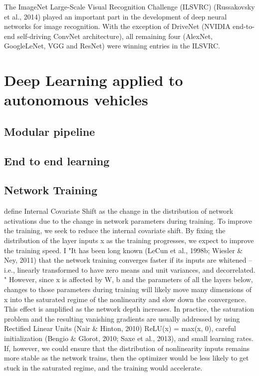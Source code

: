 The  ImageNet Large-Scale Visual Recognition Challenge (ILSVRC) (Russakovsky et al., 2014) played an important part in the development of deep neural networks for image recognition. With the exception of DriveNet (NVIDIA end-to-end self-driving ConvNet architecture), all remaining four (AlexNet, GoogleLeNet, VGG and ResNet) were winning entries in the ILSVRC.  




\section{Deep Learning applied to autonomous vehicles}

\subsection{Modular pipeline}

\subsection{End to end learning}

\subsection{Network Training}

\cite{ioffe2015batch, 7005077}
define Internal Covariate Shift as the change in the
distribution of network activations due to the change in
network parameters during training. To improve the training, we seek to reduce the internal covariate shift. By
fixing the distribution of the layer inputs x as the training
progresses, we expect to improve the training speed. I
"It has
been long known (LeCun et al., 1998b; Wiesler \& Ney,
2011) that the network training converges faster if its inputs are whitened – i.e., linearly transformed to have zero means and unit variances, and decorrelated. "
However, since x is affected by
W, b and the parameters of all the layers below, changes
to those parameters during training will likely move many
dimensions of x into the saturated regime of the nonlinearity and slow down the convergence. This effect is
amplified as the network depth increases.
 In practice,
the saturation problem and the resulting vanishing gradients are usually addressed by using Rectified Linear Units
(Nair \& Hinton, 2010) ReLU(x) = max(x, 0), careful
initialization (Bengio \& Glorot, 2010; Saxe et al., 2013),
and small learning rates. If, however, we could ensure
that the distribution of nonlinearity inputs remains more
stable as the network trains, then the optimizer would be
less likely to get stuck in the saturated regime, and the
training would accelerate.

